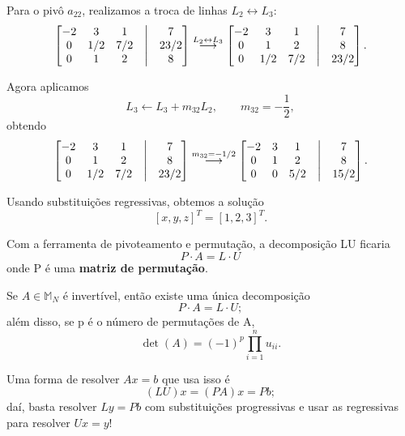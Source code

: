 \documentclass[../numerical_methods.tex]{subfiles}
\begin{document}
\begin{example}
	Para o pivô \(a_{22}\), realizamos a troca de linhas
	\(L_{2}\leftrightarrow L_{3}\):
	\[
		\begin{bmatrix}
			-2 & 3   & 1   & \bigm| & 7    \\
			0  & 1/2 & 7/2 & \bigm| & 23/2 \\
			0  & 1   & 2   & \bigm| & 8
		\end{bmatrix}
		\stackrel{L_{2}\leftrightarrow L_{3}}{\longrightarrow}
		\begin{bmatrix}
			-2 & 3   & 1   & \bigm| & 7    \\
			0  & 1   & 2   & \bigm| & 8    \\
			0  & 1/2 & 7/2 & \bigm| & 23/2
		\end{bmatrix}.
	\]

	Agora aplicamos
	\[
		L_{3}\leftarrow L_{3}+m_{32}L_{2},
		\qquad
		m_{32}=-\frac{1}{2},
	\]
	obtendo
	\[
		\begin{bmatrix}
			-2 & 3   & 1   & \bigm| & 7    \\
			0  & 1   & 2   & \bigm| & 8    \\
			0  & 1/2 & 7/2 & \bigm| & 23/2
		\end{bmatrix}
		\stackrel{m_{32}=-1/2}{\longrightarrow}
		\begin{bmatrix}
			-2 & 3 & 1   & \bigm| & 7    \\
			0  & 1 & 2   & \bigm| & 8    \\
			0  & 0 & 5/2 & \bigm| & 15/2
		\end{bmatrix}.
	\]

	Usando substituições regressivas, obtemos a solução
	\[
		[x,y,z]^{T} = [1,2,3]^{T}.
	\]
\end{example}

Com a ferramenta de pivoteamento e permutação, a decomposição LU ficaria
\[
	\boxed{P \cdot A = L \cdot U}
\]
onde P é uma \textbf{matriz de permutação}.
\begin{theorem*}
	Se \(A\in \mathbb{M}_{N}\) é invertível, então existe uma única decomposição
	\[
		P \cdot A = L \cdot U;
	\]
	além disso, se p é o número de permutações de A,
	\[
		\det{(A)} = (-1)^{p}\prod\limits_{i=1}^{n}u_{ii}.
	\]
\end{theorem*}
Uma forma de resolver \(Ax =b\) que usa isso é
\[
	(LU)x = (PA)x = Pb;
\]
daí, basta resolver \(Ly = Pb\) com substituições progressivas e usar as regressivas para resolver \(Ux = y\)!
\end{document}
